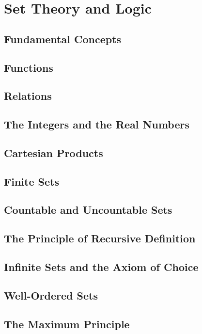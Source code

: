 \chapter{Set Theory and Logic}

\section{Fundamental Concepts}

\section{Functions}

\section{Relations}

\section{The Integers and the Real Numbers}

\section{Cartesian Products}

\section{Finite Sets}

\section{Countable and Uncountable Sets}

\section{The Principle of Recursive Definition}

\section{Infinite Sets and the Axiom of Choice}

\section{Well-Ordered Sets}

\section{The Maximum Principle}

